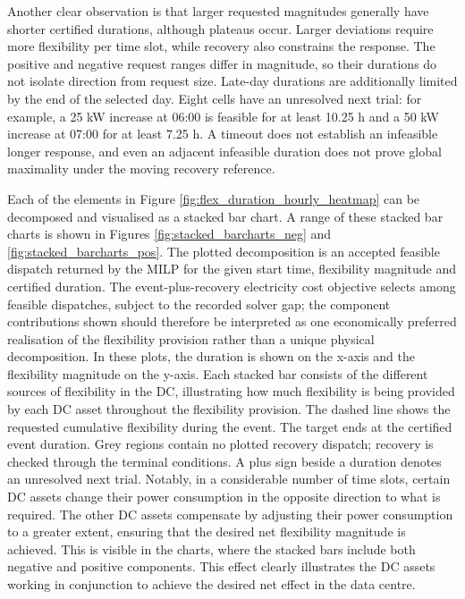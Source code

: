 \documentclass[lettersize,journal]{IEEEtran}
\begin{document}
Another clear observation is that larger requested magnitudes generally have shorter certified durations, although plateaus occur. Larger deviations require more flexibility per time slot, while recovery also constrains the response. The positive and negative request ranges differ in magnitude, so their durations do not isolate direction from request size. Late-day durations are additionally limited by the end of the selected day. Eight cells have an unresolved next trial: for example, a 25 kW increase at 06:00 is feasible for at least 10.25 h and a 50 kW increase at 07:00 for at least 7.25 h. A timeout does not establish an infeasible longer response, and even an adjacent infeasible duration does not prove global maximality under the moving recovery reference.

Each of the elements in Figure \ref{fig:flex_duration_hourly_heatmap} can be decomposed and visualised as a stacked bar chart. A range of these stacked bar charts is shown in Figures \ref{fig:stacked_barcharts_neg} and \ref{fig:stacked_barcharts_pos}. The plotted decomposition is an accepted feasible dispatch returned by the MILP for the given start time, flexibility magnitude and certified duration. The event-plus-recovery electricity cost objective selects among feasible dispatches, subject to the recorded solver gap; the component contributions shown should therefore be interpreted as one economically preferred realisation of the flexibility provision rather than a unique physical decomposition. In these plots, the duration is shown on the x-axis and the flexibility magnitude on the y-axis. Each stacked bar consists of the different sources of flexibility in the DC, illustrating how much flexibility is being provided by each DC asset throughout the flexibility provision. The dashed line shows the requested cumulative flexibility during the event. The target ends at the certified event duration. Grey regions contain no plotted recovery dispatch; recovery is checked through the terminal conditions. A plus sign beside a duration denotes an unresolved next trial. Notably, in a considerable number of time slots, certain DC assets change their power consumption in the opposite direction to what is required. The other DC assets compensate by adjusting their power consumption to a greater extent, ensuring that the desired net flexibility magnitude is achieved. This is visible in the charts, where the stacked bars include both negative and positive components. This effect clearly illustrates the DC assets working in conjunction to achieve the desired net effect in the data centre.
\end{document}
